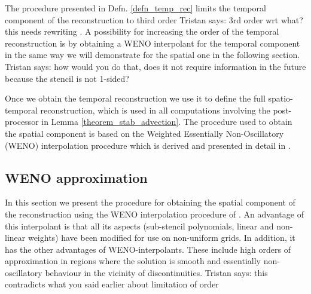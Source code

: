 \documentclass[final]{amsart}
\newcommand{\tristan}[1]{{\color{purple} Tristan says:  #1 }}
\numberwithin{equation}{section}
\begin{document}
\begin{Rem}
  The procedure presented in Defn. \ref{defn_temp_rec} limits the
  temporal component of the reconstruction to third order \tristan{3rd
    order wrt what? this needs rewriting}.  A possibility for
  increasing the order of the temporal reconstruction is by obtaining
  a WENO interpolant for the temporal component in the same way we
  will demonstrate for the spatial one in the following section.
  \tristan{how would you do that, does it not require information in
    the future because the stencil is not 1-sided?}
\end{Rem}

Once we obtain the temporal reconstruction we use it to define the
full spatio-temporal reconstruction, which is used in all computations
involving the post-processor in Lemma \ref{theorem_stab_advection}.
The procedure used to obtain the spatial component is based on the
Weighted Essentially Non-Oscillatory (WENO) interpolation procedure
which is derived and presented in detail in \cite{janett2019novel}.

\subsection{WENO approximation}

In this section we present the procedure for obtaining the spatial
component of the reconstruction using the WENO interpolation procedure
of \cite{janett2019novel}. An advantage of this interpolant is that
all its aspects (sub-stencil polynomials, linear and non-linear
weights) have been modified for use on non-uniform grids.  In
addition, it has the other advantages of WENO-interpolants.  These
include high orders of approximation in regions where the solution is
smooth and essentially non-oscillatory behaviour in the vicinity of
discontinuities. \tristan{this contradicts what you said earlier about
  limitation of order}
\end{document}

